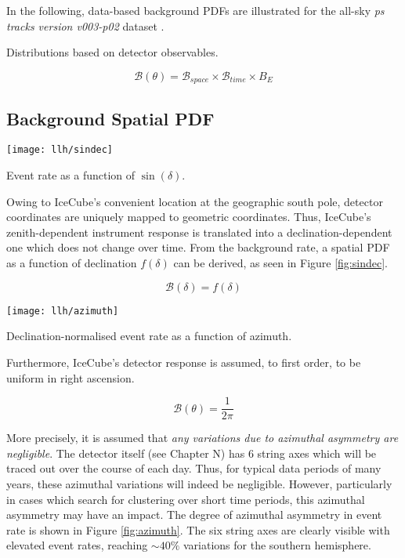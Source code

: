 In the following, data-based background PDFs are illustrated for the all-sky \emph{ps tracks version v003-p02} dataset .

Distributions based on detector observables.

\begin{equation}
\mathcal{B} (\theta) = \mathcal{B}_{space} \times \mathcal{B}_{time}  \times {B}_{E}
\end{equation}

\subsection{Background Spatial PDF}

\begin{marginfigure}
	\centering \texttt{[image: llh/sindec]}
	\caption{Event rate as a function of $\sin(\delta)$.}
	\label{fig:sindec}
\end{marginfigure}

Owing to IceCube's convenient location at the geographic south pole, detector coordinates are uniquely mapped to geometric coordinates. Thus, IceCube's zenith-dependent instrument response is translated into a declination-dependent one which does not change over time. From the background rate, a spatial PDF as a function of declination $ f(\delta)$ can be derived, as seen in Figure \ref{fig:sindec}.

\begin{equation}
	\mathcal{B} (\delta) = f(\delta)
\end{equation}

\begin{marginfigure}
	\centering \texttt{[image: llh/azimuth]}
	\caption{Declination-normalised event rate as a function of azimuth.}
	\label{fig:azimuth}
\end{marginfigure}

Furthermore, IceCube's detector response is assumed, to first order, to be uniform in right ascension. 

\begin{equation}
\mathcal{B} (\theta) = \frac{1}{2\pi} 
\end{equation}

More precisely, it is assumed that \emph{any variations due to azimuthal asymmetry are negligible}. The detector itself (see Chapter N) has 6 string axes which will be traced out over the course of each day. Thus, for typical data periods of many years, these azimuthal variations will indeed be negligible. However, particularly in cases which search for clustering over short time periods, this azimuthal asymmetry may have an impact. The degree of azimuthal asymmetry in event rate is shown in Figure \ref{fig:azimuth}.  The six string axes are clearly visible with elevated event rates, reaching $\sim40\%$ variations for the southern hemisphere.

